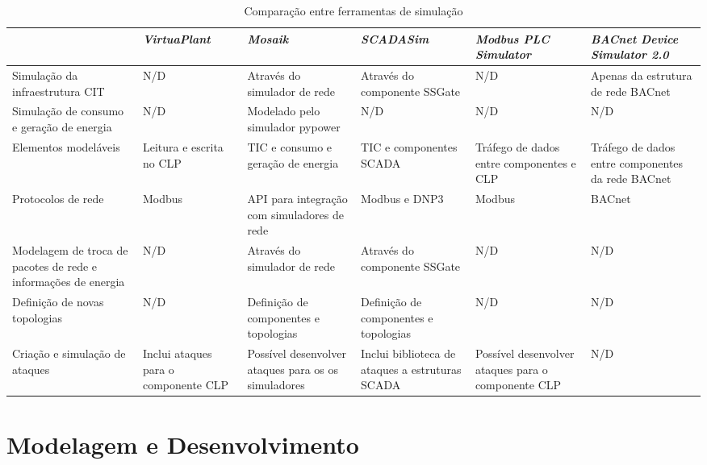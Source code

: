 \documentclass[cic,tc]{iiufrgs}
\begin{document}
\begin{table}[h]
    \caption{Comparação entre ferramentas de simulação}
    \centering
    \scriptsize
        \begin{tabular}{|m{2cm}|m{2cm}|m{2cm}|m{2cm}|m{2cm}|m{2cm}|}
          \hline
           & \textit{VirtuaPlant} & \textit{Mosaik} & \textit{SCADASim} & \textit{Modbus PLC Simulator} & \textit{BACnet Device Simulator 2.0} \\
          \hline
          \hline
          Simulação da infraestrutura CIT & N/D & Através do simulador de rede & Através do componente SSGate & N/D & Apenas da estrutura de rede BACnet \\
          \hline
          Simulação de consumo e geração de energia & N/D & Modelado pelo simulador pypower & N/D & N/D & N/D \\
          \hline
          Elementos modeláveis & Leitura e escrita no CLP & TIC e consumo e geração de energia & TIC e componentes SCADA & Tráfego de dados entre componentes e CLP & Tráfego de dados entre componentes da rede BACnet \\
          \hline 
          Protocolos de rede & Modbus & API para integração com simuladores de rede & Modbus e DNP3 & Modbus & BACnet \\
          \hline
          Modelagem de troca de pacotes de rede e informações de energia & N/D & 	Através do simulador de rede & Através do componente SSGate & N/D & N/D \\
          \hline
          Definição de novas topologias & N/D & Definição de componentes e topologias & Definição de componentes e topologias & N/D & N/D \\
          \hline
          Criação e simulação de ataques & Inclui ataques para o componente CLP & Possível desenvolver ataques para os os simuladores & Inclui biblioteca de ataques a estruturas SCADA & Possível desenvolver ataques para o componente CLP & N/D \\
          \hline
        \end{tabular}
    \label{tbl:ex1}
\end{table}

\chapter{Modelagem e Desenvolvimento}
\end{document}
